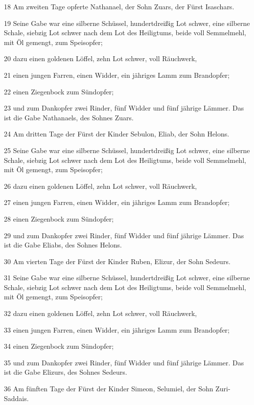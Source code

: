 \par 18 Am zweiten Tage opferte Nathanael, der Sohn Zuars, der Fürst Isaschars.
\par 19 Seine Gabe war eine silberne Schüssel, hundertdreißig Lot schwer, eine silberne Schale, siebzig Lot schwer nach dem Lot des Heiligtums, beide voll Semmelmehl, mit Öl gemengt, zum Speisopfer;
\par 20 dazu einen goldenen Löffel, zehn Lot schwer, voll Räuchwerk,
\par 21 einen jungen Farren, einen Widder, ein jähriges Lamm zum Brandopfer;
\par 22 einen Ziegenbock zum Sündopfer;
\par 23 und zum Dankopfer zwei Rinder, fünf Widder und fünf jährige Lämmer. Das ist die Gabe Nathanaels, des Sohnes Zuars.
\par 24 Am dritten Tage der Fürst der Kinder Sebulon, Eliab, der Sohn Helons.
\par 25 Seine Gabe war eine silberne Schüssel, hundertdreißig Lot schwer, eine silberne Schale, siebzig Lot schwer nach dem Lot des Heiligtums, beide voll Semmelmehl, mit Öl gemengt, zum Speisopfer;
\par 26 dazu einen goldenen Löffel, zehn Lot schwer, voll Räuchwerk,
\par 27 einen jungen Farren, einen Widder, ein jähriges Lamm zum Brandopfer;
\par 28 einen Ziegenbock zum Sündopfer;
\par 29 und zum Dankopfer zwei Rinder, fünf Widder und fünf jährige Lämmer. Das ist die Gabe Eliabs, des Sohnes Helons.
\par 30 Am vierten Tage der Fürst der Kinder Ruben, Elizur, der Sohn Sedeurs.
\par 31 Seine Gabe war eine silberne Schüssel, hundertdreißig Lot schwer, eine silberne Schale, siebzig Lot schwer nach dem Lot des Heiligtums, beide voll Semmelmehl, mit Öl gemengt, zum Speisopfer;
\par 32 dazu einen goldenen Löffel, zehn Lot schwer, voll Räuchwerk,
\par 33 einen jungen Farren, einen Widder, ein jähriges Lamm zum Brandopfer;
\par 34 einen Ziegenbock zum Sündopfer;
\par 35 und zum Dankopfer zwei Rinder, fünf Widder und fünf jährige Lämmer. Das ist die Gabe Elizurs, des Sohnes Sedeurs.
\par 36 Am fünften Tage der Fürst der Kinder Simeon, Selumiel, der Sohn Zuri-Saddais.
